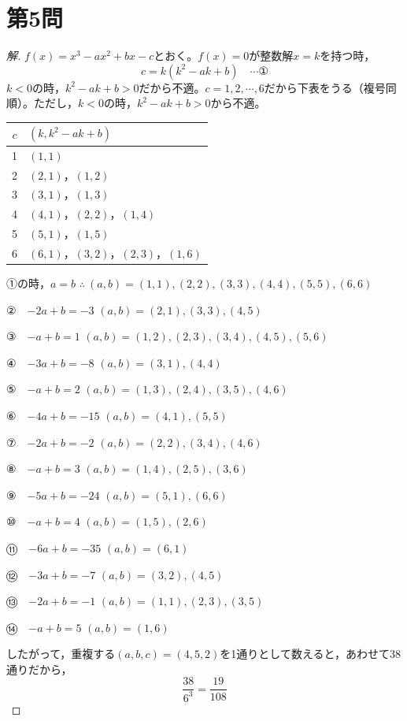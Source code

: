 \documentclass[../main.tex]{subfiles}
\begin{document}
\newpage

\section*{第5問}

\begin{proof}[解]
  $f(x)=x^3-ax^2+bx-c$とおく。$f(x)=0$が整数解$x=k$を持つ時，
  \[
    c=k(k^2-ak+b) \quad\cdots\text{①}
  \]
  $k<0$の時，$k^2-ak+b>0$だから不適。$c=1,2,\cdots,6$だから下表をうる（複号同順）。ただし，$k<0$の時，$k^2-ak+b>0$から不適。
  \begin{center}
    \begin{tabular}{c|l}
      $c$ & $(k,k^2-ak+b)$ \\
      \hline
      1 & $(1,1)$ \\
      2 & $(2,1)$，$(1,2)$ \\
      3 & $(3,1)$，$(1,3)$ \\
      4 & $(4,1)$，$(2,2)$，$(1,4)$ \\
      5 & $(5,1)$，$(1,5)$ \\
      6 & $(6,1)$，$(3,2)$，$(2,3)$，$(1,6)$
    \end{tabular}
  \end{center}
  ①の時，$a=b$ $\therefore\ (a,b)=(1,1),(2,2),(3,3),(4,4),(5,5),(6,6)$

  ②　$-2a+b=-3$ $(a,b)=(2,1),(3,3),(4,5)$

  ③　$-a+b=1$ $(a,b)=(1,2),(2,3),(3,4),(4,5),(5,6)$

  ④　$-3a+b=-8$ $(a,b)=(3,1),(4,4)$

  ⑤　$-a+b=2$ $(a,b)=(1,3),(2,4),(3,5),(4,6)$

  ⑥　$-4a+b=-15$ $(a,b)=(4,1),(5,5)$

  ⑦　$-2a+b=-2$ $(a,b)=(2,2),(3,4),(4,6)$

  ⑧　$-a+b=3$ $(a,b)=(1,4),(2,5),(3,6)$

  ⑨　$-5a+b=-24$ $(a,b)=(5,1),(6,6)$

  ⑩　$-a+b=4$ $(a,b)=(1,5),(2,6)$

  ⑪　$-6a+b=-35$ $(a,b)=(6,1)$

  ⑫　$-3a+b=-7$ $(a,b)=(3,2),(4,5)$

  ⑬　$-2a+b=-1$ $(a,b)=(1,1),(2,3),(3,5)$

  ⑭　$-a+b=5$ $(a,b)=(1,6)$

  したがって，重複する$(a,b,c)=(4,5,2)$を1通りとして数えると，あわせて38通りだから，
  \[
    \frac{38}{6^3}=\frac{19}{108}
  \]
\end{proof}
\end{document}
